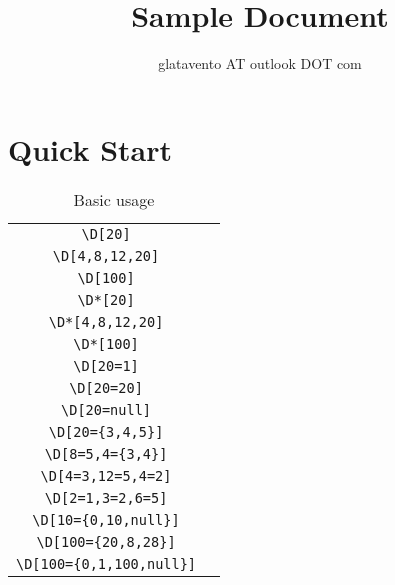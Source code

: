 \documentclass{article}
\title{Sample Document}
\author{glatavento AT outlook DOT com}
\begin{document}
\maketitle

\section{Quick Start}

\begin{table}[h!]
  \centering
  \caption{Basic usage}
  \begin{tabular}{c|c}
    \hline
    \verb|\D[20]|                 & \D[20]                 \\
    \verb|\D[4,8,12,20]|          & \D[4,8,12,20]          \\
    \verb|\D[100]|                & \D[100]                \\
    \verb|\D*[20]|                & \D*[20]                \\
    \verb|\D*[4,8,12,20]|         & \D*[4,8,12,20]         \\
    \verb|\D*[100]|               & \D*[100]               \\
    \verb|\D[20=1]|               & \D[20=1]               \\
    \verb|\D[20=20]|              & \D[20=20]              \\
    \verb|\D[20=null]|            & \D[20=null]            \\
    \verb|\D[20={3,4,5}]|         & \D[20={3,4,5}]         \\
    \verb|\D[8=5,4={3,4}]|        & \D[8={5},4={3,4}]      \\
    \verb|\D[4=3,12=5,4=2]|       & \D[4=3,12=5,4=2]       \\
    \verb|\D[2=1,3=2,6=5]|        & \D[2=1,3=2,6=5]        \\
    \verb|\D[10={0,10,null}]|     & \D[10={0,10,null}]     \\
    \verb|\D[100={20,8,28}]|      & \D[100={20,8,28}]      \\
    \verb|\D[100={0,1,100,null}]| & \D[100={0,1,100,null}] \\
    \hline
  \end{tabular}
\end{table}
\end{document}
